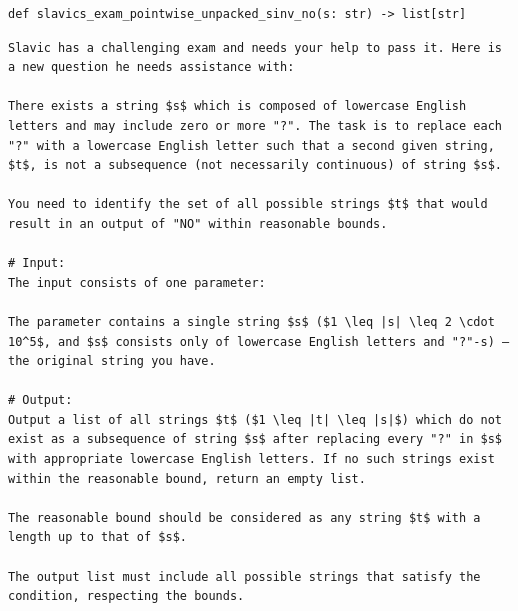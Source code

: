 \documentclass[acmsmall,screen,nonacm]{acmart}
\begin{document}
{\scriptsize
\begin{tcolorbox}[mybox,breakable,title={Set-valued partial inverse problem w.r.t. NO}]
\begin{verbatim}
def slavics_exam_pointwise_unpacked_sinv_no(s: str) -> list[str]
\end{verbatim}
\begin{verbatim}
Slavic has a challenging exam and needs your help to pass it. Here is a new question he needs assistance with:

There exists a string $s$ which is composed of lowercase English letters and may include zero or more "?". The task is to replace each "?" with a lowercase English letter such that a second given string, $t$, is not a subsequence (not necessarily continuous) of string $s$.

You need to identify the set of all possible strings $t$ that would result in an output of "NO" within reasonable bounds.

# Input:
The input consists of one parameter:

The parameter contains a single string $s$ ($1 \leq |s| \leq 2 \cdot 10^5$, and $s$ consists only of lowercase English letters and "?"-s) — the original string you have.

# Output:
Output a list of all strings $t$ ($1 \leq |t| \leq |s|$) which do not exist as a subsequence of string $s$ after replacing every "?" in $s$ with appropriate lowercase English letters. If no such strings exist within the reasonable bound, return an empty list.

The reasonable bound should be considered as any string $t$ with a length up to that of $s$.

The output list must include all possible strings that satisfy the condition, respecting the bounds.
\end{verbatim}
\end{tcolorbox}
}
\end{document}

